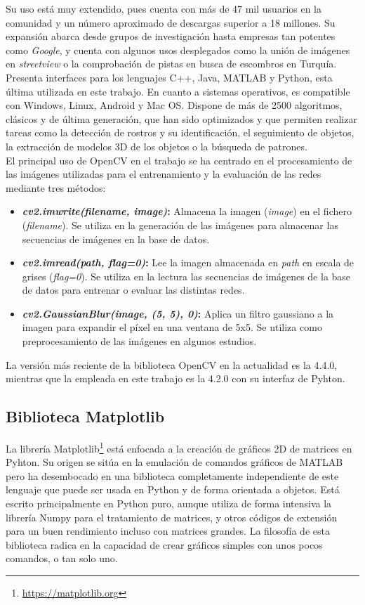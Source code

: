 Su uso está muy extendido, pues cuenta con más de 47 mil usuarios en la comunidad y un número aproximado de descargas superior a 18 millones. Su expansión abarca desde grupos de investigación hasta empresas tan potentes como \textit{Google}, y cuenta con algunos usos desplegados como la unión de imágenes en \textit{streetview} o la comprobación de pistas en busca de escombros en Turquía.\\

Presenta interfaces para los lenguajes C++, Java, MATLAB y Python, esta última utilizada en este trabajo. En cuanto a sistemas operativos, es compatible con Windows, Linux, Android y Mac OS. Dispone de más de 2500 algoritmos, clásicos y de última generación, que han sido optimizados y que permiten realizar tareas como la detección de rostros y su identificación, el seguimiento de objetos, la extracción de modelos 3D de los objetos o la búsqueda de patrones.\\

El principal uso de OpenCV en el trabajo se ha centrado en el procesamiento de las imágenes utilizadas para el entrenamiento y la evaluación de las redes mediante tres métodos:

\begin{itemize}
    \item \textbf{\textit{cv2.imwrite(filename, image)}:} Almacena la imagen (\textit{image}) en el fichero (\textit{filename}). Se utiliza en la generación de las imágenes para almacenar las secuencias de imágenes en la base de datos.
    \item \textbf{\textit{cv2.imread(path, flag=0)}:} Lee la imagen almacenada en \textit{path} en escala de grises (\textit{flag=0}). Se utiliza en la lectura las secuencias de imágenes de la base de datos para entrenar o evaluar las distintas redes.
    \item \textbf{\textit{cv2.GaussianBlur(image, (5, 5), 0)}:} Aplica un filtro gaussiano a la imagen para expandir el píxel en una ventana de 5x5. Se utiliza como preprocesamiento de las imágenes en algunos estudios.
\end{itemize}

La versión más reciente de la biblioteca OpenCV en la actualidad es la 4.4.0, mientras que la empleada en este trabajo es la 4.2.0 con su interfaz de Pyhton.

\subsection{Biblioteca Matplotlib}
La librería Matplotlib\footnote{\url{https://matplotlib.org}} está enfocada a la creación de gráficos 2D de matrices en Pyhton. Su origen se sitúa en la emulación de comandos gráficos de MATLAB pero ha desembocado en una biblioteca completamente independiente de este lenguaje que puede ser usada en Python y de forma orientada a objetos. Está escrito principalmente en Python puro, aunque utiliza de forma intensiva la librería Numpy para el tratamiento de matrices, y otros códigos de extensión para un buen rendimiento incluso con matrices grandes. La filosofía de esta biblioteca radica en la capacidad de crear gráficos simples con unos pocos comandos, o tan solo uno.\\

